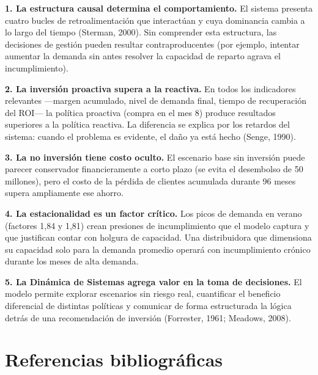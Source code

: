 \documentclass[10pt,a4paper]{article}
\begin{document}
\textbf{1. La estructura causal determina el comportamiento.} El sistema presenta cuatro bucles de retroalimentación que interactúan y cuya dominancia cambia a lo largo del tiempo (Sterman, 2000). Sin comprender esta estructura, las decisiones de gestión pueden resultar contraproducentes (por ejemplo, intentar aumentar la demanda sin antes resolver la capacidad de reparto agrava el incumplimiento).

\textbf{2. La inversión proactiva supera a la reactiva.} En todos los indicadores relevantes ---margen acumulado, nivel de demanda final, tiempo de recuperación del ROI--- la política proactiva (compra en el mes 8) produce resultados superiores a la política reactiva. La diferencia se explica por los retardos del sistema: cuando el problema es evidente, el daño ya está hecho (Senge, 1990).

\textbf{3. La no inversión tiene costo oculto.} El escenario base sin inversión puede parecer conservador financieramente a corto plazo (se evita el desembolso de 50 millones), pero el costo de la pérdida de clientes acumulada durante 96 meses supera ampliamente ese ahorro.

\textbf{4. La estacionalidad es un factor crítico.} Los picos de demanda en verano (factores 1,84 y 1,81) crean presiones de incumplimiento que el modelo captura y que justifican contar con holgura de capacidad. Una distribuidora que dimensiona su capacidad solo para la demanda promedio operará con incumplimiento crónico durante los meses de alta demanda.

\textbf{5. La Dinámica de Sistemas agrega valor en la toma de decisiones.} El modelo permite explorar escenarios sin riesgo real, cuantificar el beneficio diferencial de distintas políticas y comunicar de forma estructurada la lógica detrás de una recomendación de inversión (Forrester, 1961; Meadows, 2008).

\newpage

\section{Referencias bibliográficas}
\end{document}
